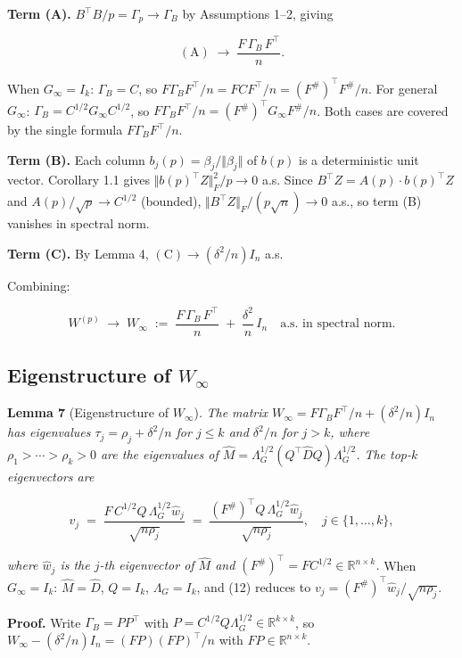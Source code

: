 \documentclass{article}
\theoremstyle{remark}
\begin{document}
\textbf{Term (A).} $B^\top B/p = \Gamma_p \to \Gamma_B$ by Assumptions 1–2, giving

\[
(\mathrm{A}) \;\longrightarrow\; \frac{F\,\Gamma_B\,F^\top}{n}.
\]

When $G_\infty = I_k$: $\Gamma_B = C$, so $F\Gamma_B F^\top/n = FCF^\top/n = (F^\#)^\top F^\#/n$. For general $G_\infty$: $\Gamma_B = C^{1/2}G_\infty C^{1/2}$, so $F\Gamma_B F^\top/n = (F^\#)^\top G_\infty F^\#/n$. Both cases are covered by the single formula $F\Gamma_B F^\top/n$.

\textbf{Term (B).} Each column $b_j(p) = \beta_j/\Vert \beta_j\Vert $ of $b(p)$ is a deterministic unit vector. Corollary 1.1 gives $\Vert b(p)^\top Z\Vert_F^2/p \to 0$ a.s. Since $B^\top Z = A(p)\cdot b(p)^\top Z$ and $A(p)/\sqrt{p} \to C^{1/2}$ (bounded), $\Vert B^\top Z\Vert_F/(p\sqrt{n}) \to 0$ a.s., so term (B) vanishes in spectral norm.

\textbf{Term (C).} By Lemma 4, $(\mathrm{C}) \to (\delta^2/n)I_n$ a.s.

Combining:

\[
W^{(p)} \;\longrightarrow\; W_\infty \;:=\; \frac{F\,\Gamma_B\,F^\top}{n} \;+\; \frac{\delta^2}{n}\,I_n \quad\text{a.s. in spectral norm.} \tag{11}
\]

\subsection{Eigenstructure of $W_\infty$}

\textbf{Lemma 7} (Eigenstructure of $W_\infty$). \textit{The matrix $W_\infty = F\Gamma_B F^\top/n + (\delta^2/n)I_n$ has eigenvalues $\tau_j = \rho_j + \delta^2/n$ for $j\le k$ and $\delta^2/n$ for $j > k$, where $\rho_1 > \cdots > \rho_k > 0$ are the eigenvalues of $\hat{M} = \Lambda_G^{1/2}(Q^\top\hat{D}Q)\Lambda_G^{1/2}$. The top-$k$ eigenvectors are}

\[
v_j \;=\; \frac{F\,C^{1/2}Q\,\Lambda_G^{1/2}\hat{w}_j}{\sqrt{n\rho_j}} \;=\; \frac{(F^\#)^\top Q\,\Lambda_G^{1/2}\hat{w}_j}{\sqrt{n\rho_j}}, \quad j\in\{1,\ldots,k\}, \tag{12}
\]

\textit{where $\hat{w}_j$ is the $j$-th eigenvector of $\hat{M}$ and $(F^\#)^\top = FC^{1/2}\in\mathbb{R}^{n\times k}$.} When $G_\infty = I_k$: $\hat{M} = \hat{D}$, $Q = I_k$, $\Lambda_G = I_k$, and (12) reduces to $v_j = (F^\#)^\top\hat{w}_j/\sqrt{n\rho_j}$.

\textbf{Proof.} Write $\Gamma_B = PP^\top$ with $P = C^{1/2}Q\Lambda_G^{1/2} \in \mathbb{R}^{k\times k}$, so $W_\infty - (\delta^2/n)I_n = (FP)(FP)^\top/n$ with $FP \in \mathbb{R}^{n\times k}$.
\end{document}
